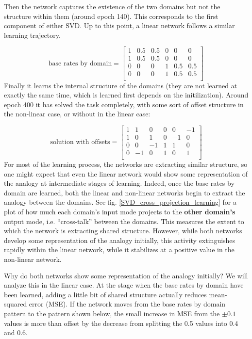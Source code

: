 \documentclass[10pt,letterpaper]{article}
\begin{document}
Then the network captures the existence of the two domains but not the structure within them (around epoch 140). This corresponds to the first component of either SVD. Up to this point, a linear network follows a similar learning trajectory. \par
\vspace{-1em}
{ 
\[
\text{base rates by domain} = \left[ \begin{matrix} 
1 & 0.5 & 0.5 & 0 & 0 & 0 \\
1 & 0.5 & 0.5 & 0 & 0 & 0 \\
0 & 0 & 0 & 1 & 0.5 & 0.5  \\
0 & 0 & 0 & 1 & 0.5 & 0.5  \\
\end{matrix}  \right] 
\] 
}
Finally it learns the internal structure of the domains (they are not learned at exactly the same time, which is learned first depends on the initilization). Around epoch 400 it has solved the task completely, with some sort of offset structure in the non-linear case, or without in the linear case:\par
\vspace{-0.5em}
{ 
\[
\text{solution with offsets} = \left[ \begin{matrix} 
1 & 1 & 0 & 0 & 0 & -1 \\
1 & 0 & 1 & 0 & -1 & 0 \\
 0 & 0 & -1 & 1 & 1 & 0\\
 0 & -1 & 0 & 1 & 0 & 1\\
\end{matrix}  \right] 
\]
}
For most of the learning process, the networks are extracting similar structure, so one might expect that even the linear network would show some representation of the analogy at intermediate stages of learning. Indeed, once the base rates by domain are learned, both the linear and non-linear networks begin to extract the analogy between the domains. See fig. \ref{SVD_cross_projection_learning} for a plot of how much each domain's input mode projects to the \textbf{other domain's} output mode, i.e. ``cross-talk'' between the domains. This measures the extent to which the network is extracting shared structure. However, while both networks develop some representation of the analogy initially, this activity extinguishes rapidly within the linear network, while it stabilizes at a positive value in the non-linear network. \par
Why do both networks show some representation of the analogy initially? We will analyze this in the linear case. At the stage when the base rates by domain have been learned, adding a little bit of shared structure actually reduces mean-squared error (MSE). If the network moves from the base rates by domain pattern to the pattern shown below, the small increase in MSE from the \(\pm 0.1\) values is more than offset by the decrease from splitting the 0.5 values into 0.4 and 0.6. \par 
\end{document}
